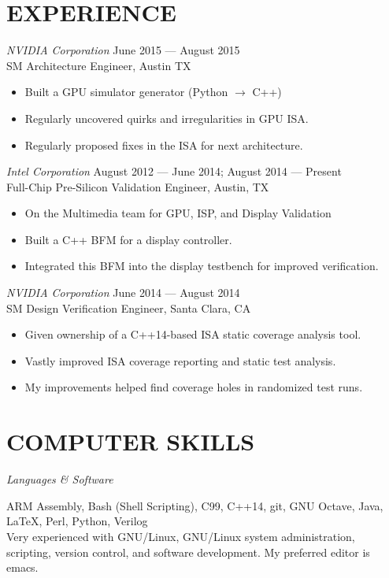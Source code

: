 \documentclass[margin]{res}
\begin{document}
\begin{resume}
  \section{EXPERIENCE}
  {\sl NVIDIA Corporation}
  \hfill June 2015 --- August 2015 \\
  SM Architecture Engineer, Austin TX
  \vspace{0.25em}
  \begin{itemize}
  \item Built a GPU simulator generator (Python $\rightarrow$ C++)
  \item Regularly uncovered quirks and irregularities in GPU ISA.
  \item Regularly proposed fixes in the ISA for next architecture.
  \end{itemize}
  {\sl Intel Corporation}
  \hfill August 2012 --- June 2014; August 2014 --- Present \\
  Full-Chip Pre-Silicon Validation Engineer, Austin, TX
  \vspace{0.25em}
  \begin{itemize}
  \item On the Multimedia team for GPU, ISP, and Display Validation
  \item Built a C++ BFM for a display controller.
  \item Integrated this BFM into the display testbench for improved
    verification.
  \end{itemize}
  {\sl NVIDIA Corporation}
  \hfill June 2014 --- August 2014 \\
  SM Design Verification Engineer, Santa Clara, CA
  \vspace{0.25em}
  \begin{itemize}
  \item Given ownership of a C++14-based ISA static coverage analysis
    tool.
  \item Vastly improved ISA coverage reporting and static test
    analysis.
  \item My improvements helped find coverage holes in randomized test
    runs.
  \end{itemize}

  \section{COMPUTER SKILLS}
  {\sl Languages \& Software} \\
  \vspace{-1.0em}
  \begin{adjustwidth}{1.5em}{0pt}
    ARM Assembly, Bash (Shell Scripting), C99, C++14, git, GNU Octave,
    Java, \LaTeX, Perl, Python, Verilog
    \vspace{0.5em} \\
    Very experienced with GNU/Linux, GNU/Linux system administration,
    scripting, version control, and software development. My preferred
    editor is emacs.
  \end{adjustwidth}


\end{resume}
\end{document}
